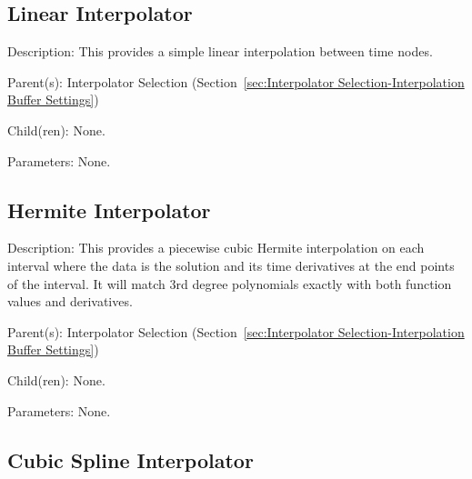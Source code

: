 \subsection{Linear Interpolator}
\label{sec:Linear Interpolator-Interpolator Selection}

\begin{list}{}
  {\setlength{\leftmargin}{1.0in}
   \setlength{\labelwidth}{0.75in}
   \setlength{\labelsep}{0.125in}}
  \item[Description:]
    This provides a simple linear interpolation between time nodes.
  \item[Parent(s):]
    Interpolator Selection (Section~\ref{sec:Interpolator Selection-Interpolation Buffer Settings})
  \item[Child(ren):]
    None. 
  \item[Parameters:]
    None. 
\end{list}

\subsection{Hermite Interpolator}
\label{sec:Hermite Interpolator-Interpolator Selection}

\begin{list}{}
  {\setlength{\leftmargin}{1.0in}
   \setlength{\labelwidth}{0.75in}
   \setlength{\labelsep}{0.125in}}
  \item[Description:]
    This provides a piecewise cubic Hermite interpolation on each interval where the data is the solution and its time derivatives at the end points of the interval.  It will match 3rd degree polynomials exactly with both function values and derivatives.
  \item[Parent(s):]
    Interpolator Selection (Section~\ref{sec:Interpolator Selection-Interpolation Buffer Settings})
  \item[Child(ren):]
    None. 
  \item[Parameters:]
    None. 
\end{list}

\subsection{Cubic Spline Interpolator}
\label{sec:Cubic Spline Interpolator-Interpolator Selection}

